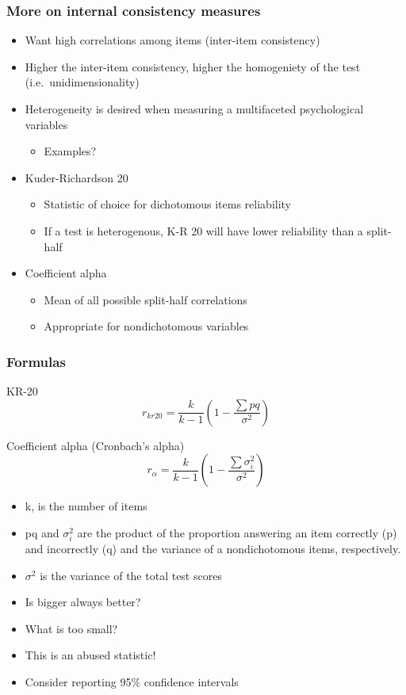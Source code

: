 \documentclass[dvipsnames]{beamer}\usepackage[]{graphicx}\usepackage[]{color}
\begin{document}
\begin{frame}
\frametitle{More on internal consistency measures}
  \begin{itemize}
  \item Want high correlations among items (\textcolor{wared}{inter-item consistency})
  \item Higher the inter-item consistency, higher the \textcolor{wared}{homogeniety} of the test (i.e.\ unidimensionality)
  \item Heterogeneity is desired when measuring a multifaceted psychological variables
    \begin{itemize}
      \item Examples?
    \end{itemize}
    \item \textcolor{wared}{Kuder-Richardson 20} 
      \begin{itemize}
        \item Statistic of choice for dichotomous items reliability
        \item If a test is heterogenous, K-R 20 will have lower reliability than a split-half
      \end{itemize}
      \item \textcolor{wared}{Coefficient alpha}
        \begin{itemize}
          \item Mean of all possible split-half correlations
          \item Appropriate for nondichotomous variables
        \end{itemize}
  \end{itemize}
\end{frame}

\begin{frame}
\frametitle{Formulas}
\centering \textcolor{wared}{KR-20}
$$r_{kr20} = \frac{k}{k - 1}\left(1 - \frac{\sum pq}{\sigma^2}\right)$$


\centering \textcolor{wared}{Coefficient alpha (Cronbach's alpha)}
$$r_{\alpha} = \frac{k}{k - 1}\left(1 - \frac{\sum \sigma^2_i}{\sigma^2}\right)$$

\begin{itemize}
  \item k, is the number of items
  \item pq and $\sigma^2_i$ are the product of the proportion answering an item correctly (p) and incorrectly (q) and the variance of a nondichotomous items, respectively.
  \item $\sigma^2$ is the variance of the total test scores
  \item<2-> \textcolor{wapurple}{Is bigger always better?}
  \item<3-> \textcolor{wapurple}{What is too small?}
  \item<4-> \textcolor{wared}{This is an abused statistic!}
  \item<4-> \textcolor{wared}{Consider reporting 95\% confidence intervals}
\end{itemize}
\end{frame}
\end{document}
